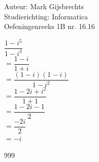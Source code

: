 \documentclass[a4paper]{article}
\begin{document}
\noindent \large Auteur: Mark Gijsbrechts \\
\noindent \large Studierichting: Informatica\\
\noindent \large Oefeningenreeks 1B nr. 16.16\\

\medskip

\normalsize



$\dfrac{1 - i^5}{1 - i^3}$ \\

$=\dfrac{1 - i}{1 + i}$ \\

$=\dfrac{\left(1 - i\right)\left(1 - i\right)}{1 - i^2}$ \\

$=\dfrac{1 -2i + i^2}{1 + 1}$ \\

$=\dfrac{1 -2i -1}{2}$ \\

$=\dfrac{-2i}{2}$ \\

$=-i$ \\

\begin{thebibliography}{999}
\end{thebibliography}
\end{document}
